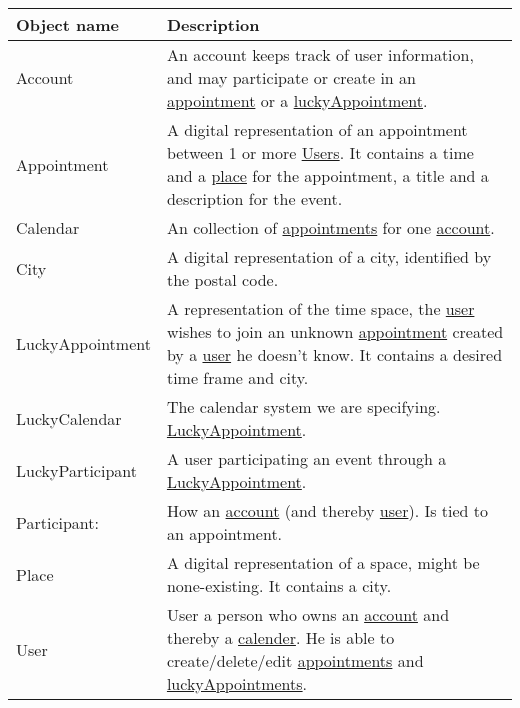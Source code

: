 {\tabulinesep=1.2mm
\begin{tabu}{ | p{3cm} | p{13cm} |}\hline
    Object name 			& 		Description\\\hline
    Account 				& 		An account keeps track of user information, and may participate or create in an \uline{appointment} or a \uline{luckyAppointment}. \\\hline
	Appointment				&		A digital representation of an appointment between 1 or more \uline{Users}. It contains a time and a \uline{place} for the appointment, a title and a description for the event.\\\hline
	Calendar				&		An collection of \uline{appointments} for one \uline{account}.\\ \hline
    City 					& 		A digital representation of a city, identified by the postal code.\\\hline
	LuckyAppointment		&		A representation of the time space, the \uline{user} wishes to join an unknown \uline{appointment} created by a \uline{user} he doesn't know. It contains a desired time frame and city.\\\hline
	LuckyCalendar			&		The calendar system we are specifying. \uline{LuckyAppointment}.\\\hline
	LuckyParticipant		&		A user participating an event through a \uline{LuckyAppointment}.\\\hline
	Participant: 			&		How an \uline{account} (and thereby \uline{user}). Is tied to an appointment.\\\hline
    Place 					& 		A digital representation of a space, might be none-existing. It contains a city.\\\hline
    User  					& 		User a person who owns an \uline{account} and thereby a \uline{calender}. He is able to create/delete/edit \uline{appointments} and  \uline{luckyAppointments}. \\\hline
\end{tabu}
}